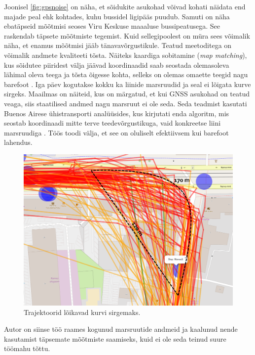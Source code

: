Joonisel \ref{fig:gpsnoise} on näha, et sõidukite asukohad võivad kohati näidata end majade peal ehk  kohtades, kuhu bussidel ligipääs puudub. Samuti on näha ebatäpseid mõõtmisi seoses Viru Keskuse maaaluse bussipeatusega. See raskendab täpsete mõõtmiste tegemist. Kuid sellegipoolest on müra sees võimalik näha, et enamus mõõtmisi jääb tänavavõrgustikule. Teatud meetoditega on võimalik andmete kvaliteeti tõsta. Näiteks kaardiga sobitamine (\textit{map matching}), kus sõidutee piiridest välja jäävad koordinaadid saab seostada olemasoleva lähimal oleva teega ja tõsta õigesse kohta, selleks on olemas omaette teegid nagu barefoot \cite{barefoot}. Iga päev kogutakse kokku ka liinide marsruudid ja seal ei lõigata kurve sirgeks. Maailmas on näiteid, kus on märgatud, et kui GNSS asukohad on teatud veaga, siis staatilised andmed nagu marsruut ei ole seda. Seda teadmist kasutati Buenos Airese ühistransporti analüüsides, kus kirjutati enda algoritm, mis seostab koordinaadi mitte terve teedevõrgustikuga, vaid konkreetse liini marsruudiga \cite{buenosAires}. Töös toodi välja, et see on oluliselt efektiivsem kui barefoot lahendus.

\begin{figure}[H] %
    \centering
    \includegraphics[width=.8\textwidth]{figures/Kurvsirgemaks.png} %
    \caption{Trajektoorid lõikavad kurvi sirgemaks.} %
    \label{fig:kurvsirgeks} %
\end{figure}


Autor on siinse töö raames kogunud marsruutide andmeid ja kaalunud nende kasutamist täpsemate mõõtmiste saamiseks, kuid ei ole seda teinud suure töömahu tõttu.

